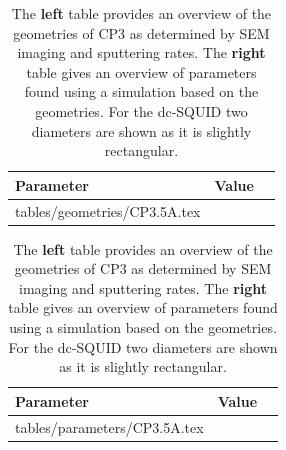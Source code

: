 \begin{table}
	\centering
	\begin{subtable}{.6\linewidth}
		\begin{tabular}[t]{@{}lrr@{}}
			\toprule
			Parameter & Value \\ \midrule
			\expandableinput tables/geometries/CP3.5A.tex
			\bottomrule
		\end{tabular}
    \end{subtable}
    \hfill
    \begin{subtable}{.3\linewidth}
    	\flushright
    	\begin{tabular}[t]{@{}lrr@{}}
    		\toprule
    		Parameter & Value \\ \midrule
    		\expandableinput tables/parameters/CP3.5A.tex
    		\bottomrule
    	\end{tabular}
    \end{subtable}
    \caption{The \textbf{left} table provides an overview of the geometries of CP3 as determined by SEM imaging and sputtering rates. The \textbf{right} table gives an overview of parameters found using a simulation based on the geometries. For the dc-SQUID two diameters are shown as it is slightly rectangular.}
    \label{tab:CP3.5A-geometries}
\end{table}